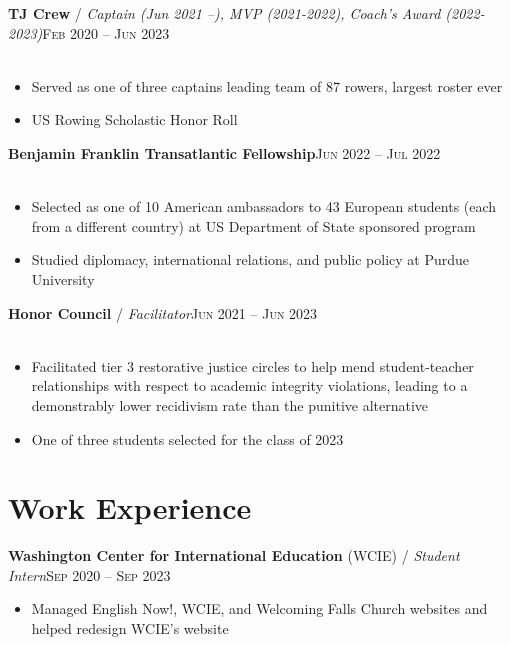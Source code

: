 \documentclass[12pt, a4paper]{article}
\begin{document}
\textbf{TJ Crew} / \textit{Captain (Jun 2021 --), MVP (2021-2022), Coach's Award (2022-2023)}\hfill\textsc{Feb 2020 -- Jun 2023}\\\
\begin{itemize}
    \vspace{-8mm}
    \item Served as one of three captains leading team of 87 rowers, largest roster ever
    \item US Rowing Scholastic Honor Roll
\end{itemize}

\textbf{Benjamin Franklin Transatlantic Fellowship}\hfill\textsc{Jun 2022 -- Jul 2022}\\\
\begin{itemize}
    \vspace{-8mm}
    \item Selected as one of 10 American ambassadors to 43 European students (each from a different country) at US Department of State sponsored program
    \item Studied diplomacy, international relations, and public policy at Purdue University
\end{itemize}

\textbf{Honor Council} / \textit{Facilitator}\hfill\textsc{Jun 2021 -- Jun 2023}\\\
\begin{itemize}
    \vspace{-8mm}
    \item Facilitated tier 3 restorative justice circles to help mend student-teacher relationships with respect to academic integrity violations, leading to a demonstrably lower recidivism rate than the punitive alternative
    \item One of three students selected for the class of 2023
\end{itemize}

\vspace{-8mm}
\section*{Work Experience}
\vspace{-2mm}

\textbf{Washington Center for International Education} (WCIE) / \textit{Student Intern}\hfill\textsc{Sep 2020 -- Sep 2023}\\
\begin{itemize}
    \vspace{-8mm}
    \item Managed English Now!, WCIE, and Welcoming Falls Church websites and helped redesign WCIE's website
\end{itemize}
\end{document}
